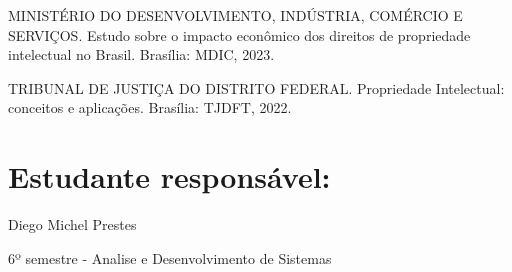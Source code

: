 \documentclass[12pt, a4paper]{article}
\begin{document}
MINISTÉRIO DO DESENVOLVIMENTO, INDÚSTRIA, COMÉRCIO E SERVIÇOS. Estudo sobre o impacto econômico dos direitos de propriedade intelectual no Brasil. Brasília: MDIC, 2023.

TRIBUNAL DE JUSTIÇA DO DISTRITO FEDERAL. Propriedade Intelectual: conceitos e aplicações. Brasília: TJDFT, 2022.

\section{Estudante responsável:}

Diego Michel Prestes

6º semestre - Analise e Desenvolvimento de Sistemas
\end{document}
